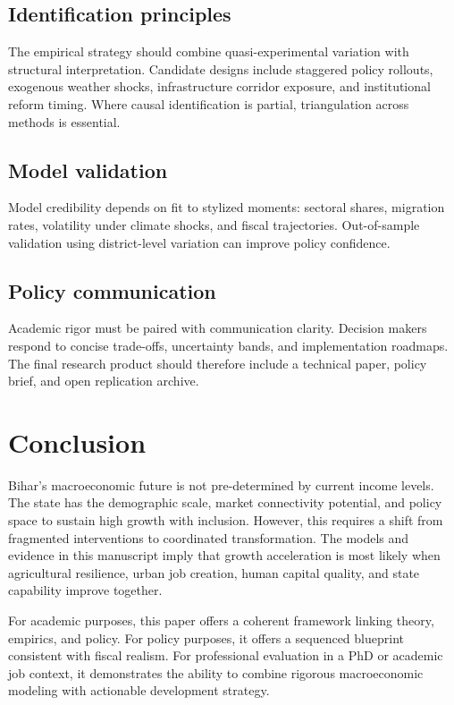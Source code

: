 \documentclass[preprint,12pt]{elsarticle}
\begin{document}
\subsection{Identification principles}
The empirical strategy should combine quasi-experimental variation with structural interpretation. Candidate designs include staggered policy rollouts, exogenous weather shocks, infrastructure corridor exposure, and institutional reform timing. Where causal identification is partial, triangulation across methods is essential.

\subsection{Model validation}
Model credibility depends on fit to stylized moments: sectoral shares, migration rates, volatility under climate shocks, and fiscal trajectories. Out-of-sample validation using district-level variation can improve policy confidence.

\subsection{Policy communication}
Academic rigor must be paired with communication clarity. Decision makers respond to concise trade-offs, uncertainty bands, and implementation roadmaps. The final research product should therefore include a technical paper, policy brief, and open replication archive.


\section{Conclusion}
Bihar's macroeconomic future is not pre-determined by current income levels. The state has the demographic scale, market connectivity potential, and policy space to sustain high growth with inclusion. However, this requires a shift from fragmented interventions to coordinated transformation. The models and evidence in this manuscript imply that growth acceleration is most likely when agricultural resilience, urban job creation, human capital quality, and state capability improve together.

For academic purposes, this paper offers a coherent framework linking theory, empirics, and policy. For policy purposes, it offers a sequenced blueprint consistent with fiscal realism. For professional evaluation in a PhD or academic job context, it demonstrates the ability to combine rigorous macroeconomic modeling with actionable development strategy.
\end{document}
